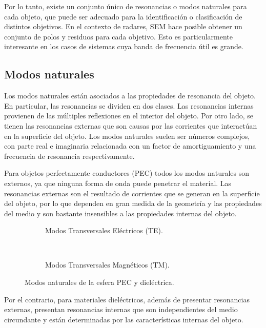 Por lo tanto, existe un conjunto único de resonancias o modos naturales para cada objeto, que puede ser adecuado para la identificación o clasificación de distintos objetivos. En el contexto de radares, SEM hace posible obtener un conjunto de polos y residuos para cada objetivo. Esto es particularmente interesante en los casos de sistemas cuya banda de frecuencia útil es grande. 


 \subsection{Modos naturales}

Los modos naturales están asociados a las propiedades de resonancia del objeto. En particular, las resonancias se dividen en dos clases. Las resonancias internas provienen de las múltiples reflexiones en el interior del objeto. Por otro lado, se tienen las resonancias externas que son causas por las corrientes que interactúan en la superficie del objeto. Los modos naturales suelen ser números complejos, con parte real e imaginaria relacionada con un factor de amortiguamiento y una frecuencia de resonancia respectivamente.

Para objetos perfectamente conductores (PEC) todos los modos naturales son externos, ya que ninguna forma de onda puede penetrar el material. Las resonancias externas son el resultado de corrientes que se generan en la superficie del objeto, por lo que dependen en gran medida de la geometría y las propiedades del medio y son bastante insensibles a las propiedades internas del objeto.
\begin{figure}[t]
	\centering 
	\begin{subfigure}{0.45\textwidth}
		\centering
		\resizebox{\linewidth}{!}{}
		\caption{Modos Transversales Eléctricos (TE).}
		\label{Fig:ModesTE}
	\end{subfigure}
	~
	\begin{subfigure}{0.45\textwidth}
		\centering
		\resizebox{\linewidth}{!}{}
		\caption{Modos Transversales Magnéticos (TM).}
		\label{Fig:ModesTM}
	\end{subfigure}
	\caption{Modos naturales de la esfera PEC y dieléctrica.}
	\label{Fig:Modes}
\end{figure} 

Por el contrario, para materiales dieléctricos, además de presentar resonancias externas, presentan resonancias internas que son independientes del medio circundante y están determinadas por las características internas del objeto. 

